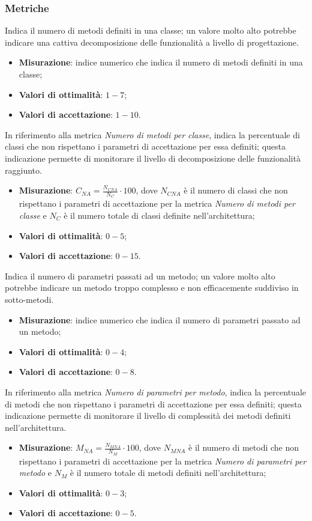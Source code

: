 \subsubsection{Metriche}
\label{numMetodiClasse}
Indica il numero di metodi definiti in una classe; un valore molto alto potrebbe indicare una cattiva decomposizione delle funzionalità a livello di progettazione.
\begin{itemize}
\item \textbf{Misurazione}: indice numerico che indica il numero di metodi definiti in una classe;
\item \textbf{Valori di ottimalità}: $1 - 7$;
\item \textbf{Valori di accettazione}: $1 - 10$.
\end{itemize}
\label{numMetodiClasseNA}
In riferimento alla metrica \textit{Numero di metodi per classe}, indica la percentuale di classi che non rispettano i parametri di accettazione per essa definiti; questa indicazione permette di monitorare il livello di decomposizione delle funzionalità raggiunto.
\begin{itemize}
\item \textbf{Misurazione}: $C_{NA}=\frac{N_{CNA}}{N_{C}} \cdot 100$, dove $N_{CNA}$ è il numero di classi che non rispettano i parametri di accettazione per la metrica \textit{Numero di metodi per classe} e $N_{C}$ è il numero totale di classi definite nell'architettura;
\item \textbf{Valori di ottimalità}: $0 - 5$;
\item \textbf{Valori di accettazione}: $0 - 15$.
\end{itemize}
Indica il numero di parametri passati ad un metodo; un valore molto alto potrebbe indicare un metodo troppo complesso e non efficacemente suddiviso in sotto-metodi.
\begin{itemize}
\item \textbf{Misurazione}: indice numerico che indica il numero di parametri passato ad un metodo;
\item \textbf{Valori di ottimalità}: $0 - 4$;
\item \textbf{Valori di accettazione}: $0 - 8$.
\end{itemize}
\label{numParMetodoNA}
In riferimento alla metrica \textit{Numero di parametri per metodo}, indica la percentuale di metodi che non rispettano i parametri di accettazione per essa definiti; questa indicazione permette di monitorare il livello di complessità dei metodi definiti nell'architettura.
\begin{itemize}
\item \textbf{Misurazione}: $M_{NA}=\frac{N_{MNA}}{N_{M}} \cdot 100$, dove $N_{MNA}$ è il numero di metodi che non rispettano i parametri di accettazione per la metrica \textit{Numero di parametri per metodo} e $N_{M}$ è il numero totale di metodi definiti nell'architettura;
\item \textbf{Valori di ottimalità}: $0 - 3$;
\item \textbf{Valori di accettazione}: $0 - 5$.
\end{itemize}
